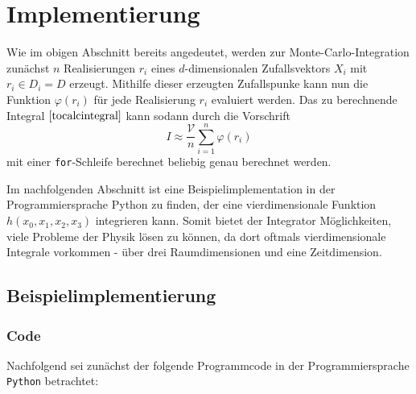 \documentclass[a4paper,12pt]{article}
\begin{document}
\section{Implementierung}
Wie im obigen Abschnitt bereits angedeutet, werden zur Monte-Carlo-Integration zunächst $n$ Realisierungen $r_i$ eines $d$-dimensionalen Zufallsvektors $X_i$ mit $r_i \in D_i = D$ erzeugt. Mithilfe dieser erzeugten Zufallspunke kann nun die Funktion $\varphi(r_i)$ für jede Realisierung $r_i$ evaluiert werden. Das zu berechnende Integral $\eqref{tocalcintegral}$ kann sodann durch die Vorschrift \begin{equation}
	I \approx \frac{\mathcal{V}}{n}\sum_{i=1}^{n}\varphi(r_i)
\end{equation} mit einer \texttt{for}-Schleife berechnet beliebig genau berechnet werden.

Im nachfolgenden Abschnitt ist eine Beispielimplementation in der Programmiersprache Python zu finden, der eine vierdimensionale Funktion $h(x_0,x_1,x_2,x_3)$ integrieren kann. Somit bietet der Integrator Möglichkeiten, viele Probleme der Physik lösen zu können, da dort oftmals vierdimensionale Integrale vorkommen - über drei Raumdimensionen und eine Zeitdimension.

\subsection{Beispielimplementierung}
\subsubsection{Code}
Nachfolgend sei zunächst der folgende Programmcode in der Programmiersprache \texttt{Python} betrachtet:
\end{document}
